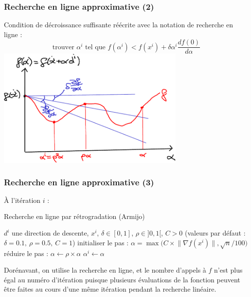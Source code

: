 \documentclass[12pt]{beamer}
\begin{document}
\begin{frame}
\frametitle{Recherche en ligne approximative (2)} 
Condition de décroissance suffisante réécrite avec la notation de recherche en ligne :
\begin{equation*}
\text{trouver } \alpha^i \text{ tel que } f(\alpha^i) < f(x^i) + \delta \alpha^i \frac{d f(0)}{d \alpha}
\end{equation*}
\centering
\includegraphics[width=0.7\textwidth]{line_search_backtrack-crop.pdf} 
\end{frame}

\begin{frame}
\frametitle{Recherche en ligne approximative (3)} 
À l’itération $i$ :
\begin{block}{Recherche en ligne par rétrogradation (Armijo)}
\begin{algorithmic}
\REQUIRE $d^i$ une direction de descente, $x^i$, $\delta \in [0,1]$, $\rho \in ]0,1[$, $C>0$
\STATE (valeurs par défaut : $\delta=0.1,~\rho=0.5,~C=1$)
\STATE initialiser le pas : $\alpha = \max\bigl(C \times \lVert \nabla f(x^i) \rVert , \sqrt{n}/100\bigr)$ 
\STATE réduire le pas : $\alpha \leftarrow \rho \times \alpha$
\ENDWHILE 
\RETURN $\alpha^i \leftarrow \alpha$
\end{algorithmic}
\end{block}
Dorénavant, on utilise la recherche en ligne, et le nombre d’appels à $f$ n’est plus égal au numéro d’itération puisque plusieurs évaluations de la fonction peuvent être faites au cours d’une même itération pendant la recherche linéaire.
\end{frame}
\end{document}
